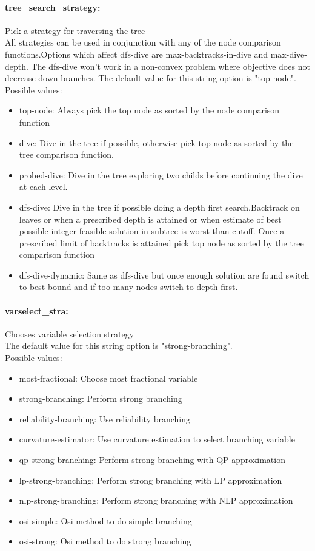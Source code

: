 \paragraph{tree\_search\_strategy:} Pick a strategy for traversing the tree $\;$ \\
 All strategies can be used in conjunction with
any of the node comparison functions.Options
which affect dfs-dive are max-backtracks-in-dive
and max-dive-depth. The dfs-dive won't work in a
non-convex problem where objective does not
decrease down branches.
The default value for this string option is "top-node".
\\ 
Possible values:
\begin{itemize}
   \item top-node:  Always pick the top node as sorted by the node
comparison function
   \item dive: Dive in the tree if possible, otherwise pick
top node as sorted by the tree comparison
function.
   \item probed-dive: Dive in the tree exploring two childs before
continuing the dive at each level.
   \item dfs-dive: Dive in the tree if possible doing a depth
first search.Backtrack on leaves or when a
prescribed depth is attained or when estimate
of best possible integer feasible solution in
subtree is worst than cutoff. Once a prescribed
limit of backtracks is attained pick top node
as sorted by the tree comparison function
   \item dfs-dive-dynamic: Same as dfs-dive but once enough solution are
found switch to best-bound and if too many
nodes switch to depth-first.
\end{itemize}

\paragraph{varselect\_stra:} Chooses variable selection strategy $\;$ \\

The default value for this string option is "strong-branching".
\\ 
Possible values:
\begin{itemize}
   \item most-fractional: Choose most fractional variable
   \item strong-branching: Perform strong branching
   \item reliability-branching: Use reliability branching
   \item curvature-estimator: Use curvature estimation to select branching
variable
   \item qp-strong-branching: Perform strong branching with QP approximation
   \item lp-strong-branching: Perform strong branching with LP approximation
   \item nlp-strong-branching: Perform strong branching with NLP approximation
   \item osi-simple: Osi method to do simple branching
   \item osi-strong: Osi method to do strong branching
\end{itemize}

